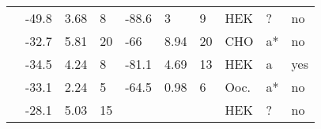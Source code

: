 \begin{footnotesize}
\begin{longtable}{p{5cm}|lll|lll|lll}
\citet{Yokoi2005MutationDB} & -49.8 & 3.68 & 8 & -88.6 & 3 & 9 & HEK & ? & no \\
\citet{Young2005MutationDB} & -32.7 & 5.81 & 20 & -66 & 8.94 & 20 & CHO & a* & no \\
\citet{Zeng2013MutationDB} & -34.5 & 4.24 & 8 & -81.1 & 4.69 & 13 & HEK & a & yes \\
\citet{Zhang2008MutationDB} & -33.1 & 2.24 & 5 & -64.5 & 0.98 & 6 & Ooc. & a* & no \\
\citet{Zhang2015MutationDB} & -28.1 & 5.03 & 15 & && & HEK & ? & no \\
\end{longtable}
\end{footnotesize}
